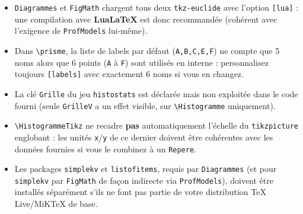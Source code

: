 \documentclass[11pt,a4paper]{article}
\newcommand{\pkg}[1]{\texttt{#1}}
\newcommand{\cmdname}[1]{\texttt{\textbackslash#1}}
\begin{document}
\begin{itemize}
  \item \pkg{Diagrammes} et \pkg{FigMath} chargent tous deux \texttt{tkz-euclide} avec l'option \texttt{[lua]} : une compilation avec \textbf{LuaLaTeX} est donc recommandée (cohérent avec l'exigence de \texttt{ProfModels} lui-même).
  \item Dans \cmdname{prisme}, la liste de labels par défaut (\texttt{A,B,C,E,F}) ne compte que 5 noms alors que 6 points (\texttt{A} à \texttt{F}) sont utilisés en interne : personnalisez toujours \texttt{[labels]} avec exactement 6 noms si vous en changez.
  \item La clé \texttt{Grille} du jeu \texttt{histostats} est déclarée mais non exploitée dans le code fourni (seule \texttt{GrilleV} a un effet visible, sur \cmdname{Histogramme} uniquement).
  \item \cmdname{HistogrammeTikz} ne recadre \textbf{pas} automatiquement l'échelle du \texttt{tikzpicture} englobant : les unités \texttt{x}/\texttt{y} de ce dernier doivent être cohérentes avec les données fournies si vous le combinez à un \texttt{Repere}.
  \item Les packages \pkg{simplekv} et \pkg{listofitems}, requis par \pkg{Diagrammes} (et pour \pkg{simplekv} par \pkg{FigMath} de façon indirecte via \texttt{ProfModels}), doivent être installés séparément s'ils ne font pas partie de votre distribution TeX Live/MiKTeX de base.
\end{itemize}
\end{document}
